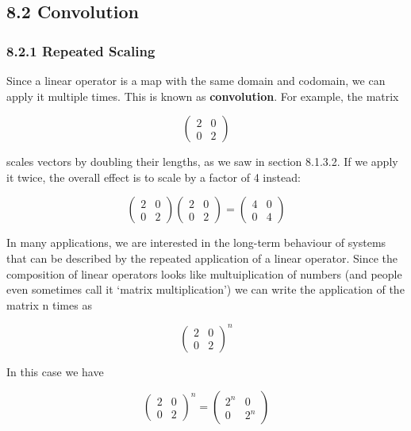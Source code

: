 \documentclass[oneside,english]{amsbook}
\numberwithin{section}{chapter}
\theoremstyle{plain}
\theoremstyle{definition}
\begin{document}
\subsection{8.2 Convolution}\label{convolution}

\subsubsection{8.2.1 Repeated Scaling}\label{repeated-scaling}

Since a linear operator is a map with the same domain and codomain, we
can apply it multiple times. This is known as \textbf{convolution}. For
example, the matrix

\[\begin{pmatrix}
	2 & 0 \\
	0 & 2
\end{pmatrix}\]

scales vectors by doubling their lengths, as we saw in section 8.1.3.2.
If we apply it twice, the overall effect is to scale by a factor of 4
instead:

\[\begin{pmatrix}
	2 & 0 \\
	0 & 2
\end{pmatrix}\begin{pmatrix}
	2 & 0 \\
	0 & 2
\end{pmatrix} = \begin{pmatrix}
	4 & 0 \\
	0 & 4
\end{pmatrix}\]

In many applications, we are interested in the long-term behaviour of
systems that can be described by the repeated application of a linear
operator. Since the composition of linear operators looks like
multuiplication of numbers (and people even sometimes call it `matrix
multiplication') we can write the application of the matrix n times as

\[\begin{pmatrix}
	2 & 0 \\
	0 & 2
\end{pmatrix}^{n}\]

In this case we have

\[\begin{pmatrix}
	2 & 0 \\
	0 & 2
\end{pmatrix}^{n} = \begin{pmatrix}
	2^{n} & 0 \\
	0 & 2^{n}
\end{pmatrix}\]
\end{document}
